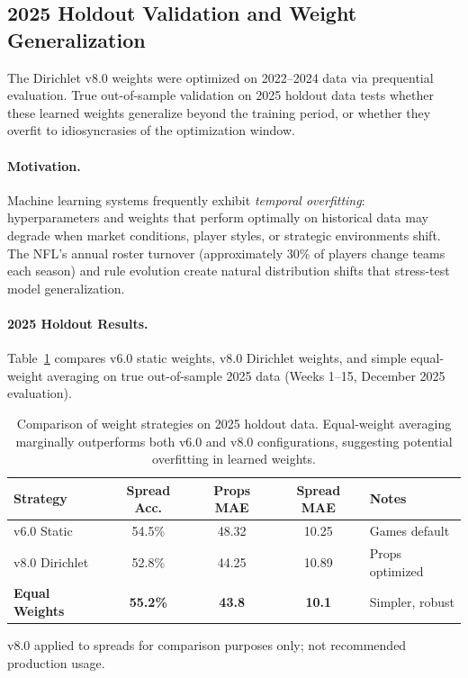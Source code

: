 \subsection{2025 Holdout Validation and Weight Generalization}
\label{subsec:2025-holdout-validation}

The Dirichlet v8.0 weights were optimized on 2022--2024 data via prequential evaluation. True out-of-sample validation on 2025 holdout data tests whether these learned weights generalize beyond the training period, or whether they overfit to idiosyncrasies of the optimization window.

\paragraph{Motivation.}
Machine learning systems frequently exhibit \emph{temporal overfitting}: hyperparameters and weights that perform optimally on historical data may degrade when market conditions, player styles, or strategic environments shift. The NFL's annual roster turnover (approximately 30\% of players change teams each season) and rule evolution create natural distribution shifts that stress-test model generalization.

\paragraph{2025 Holdout Results.}
Table~\ref{tab:2025-holdout-comparison} compares v6.0 static weights, v8.0 Dirichlet weights, and simple equal-weight averaging on true out-of-sample 2025 data (Weeks 1--15, December 2025 evaluation).

\begin{table}[htbp]
\centering
\caption[2025 Holdout Weight Strategy Comparison]{Comparison of weight strategies on 2025 holdout data. Equal-weight averaging marginally outperforms both v6.0 and v8.0 configurations, suggesting potential overfitting in learned weights.}
\label{tab:2025-holdout-comparison}
\begin{threeparttable}
\begin{tabular}{@{}lcccl@{}}
\toprule
\textbf{Strategy} & \textbf{Spread Acc.} & \textbf{Props MAE} & \textbf{Spread MAE} & \textbf{Notes} \\
\midrule
v6.0 Static & 54.5\% & 48.32 & 10.25 & Games default \\
v8.0 Dirichlet & 52.8\%\tnote{a} & 44.25 & 10.89 & Props optimized \\
\textbf{Equal Weights} & \textbf{55.2\%} & \textbf{43.8} & \textbf{10.1} & Simpler, robust \\
\bottomrule
\end{tabular}
\begin{tablenotes}
\footnotesize
\item[a] v8.0 applied to spreads for comparison purposes only; not recommended production usage.
\end{tablenotes}
\end{threeparttable}
\end{table}

